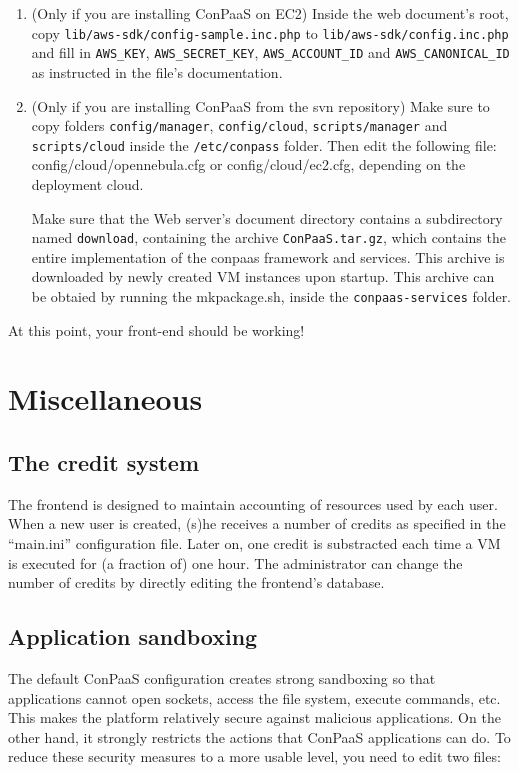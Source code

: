 \documentclass[10pt]{article}
\begin{document}
\begin{enumerate}
\item (Only if you are installing ConPaaS on EC2) 
  Inside the web document's root, copy
  \verb+lib/aws-sdk/config-sample.inc.php+ to
  \verb+lib/aws-sdk/config.inc.php+ and fill in \verb+AWS_KEY+,
  \verb+AWS_SECRET_KEY+, \verb+AWS_ACCOUNT_ID+ and
  \verb+AWS_CANONICAL_ID+ as instructed in the file's documentation.

\item (Only if you are installing ConPaaS from the svn repository)
  Make sure to copy folders \verb+config/manager+, \verb+config/cloud+,
  \verb+scripts/manager+ and \verb+scripts/cloud+ inside the 
  \verb+/etc/conpass+ folder. Then edit the 
  following file: config/cloud/opennebula.cfg or config/cloud/ec2.cfg,
  depending on the deployment cloud.

  Make sure that the Web server's document directory contains a
  subdirectory named \verb+download+, containing the archive
  \verb+ConPaaS.tar.gz+, which contains the entire implementation
  of the conpaas framework and services. This archive is downloaded by newly
  created VM instances upon startup. This archive can be obtaied
  by running the mkpackage.sh, inside the \verb+conpaas-services+ folder.

\end{enumerate}

At this point, your front-end should be working!

\section{Miscellaneous}
\subsection{The credit system}

The frontend is designed to maintain accounting of resources used by
each user. When a new user is created, (s)he receives a number of
credits as specified in the ``main.ini'' configuration file. Later on,
one credit is substracted each time a VM is executed for (a fraction
of) one hour. The administrator can change the number of credits by
directly editing the frontend's database. 

\subsection{Application sandboxing}

The default ConPaaS configuration creates strong sandboxing so that
applications cannot open sockets, access the file system, execute
commands, etc. This makes the platform relatively secure against
malicious applications. On the other hand, it strongly restricts the
actions that ConPaaS applications can do. To reduce these security
measures to a more usable level, you need to edit two files:
\end{document}
